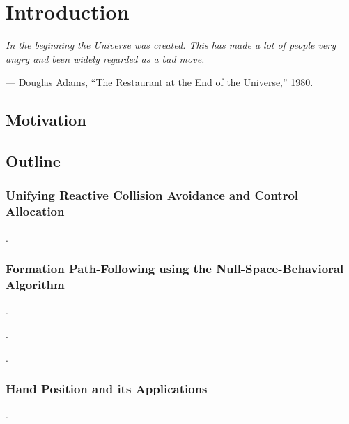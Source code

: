 \chapter{Introduction}
\label{chap:introduction}

\setlength{\epigraphwidth}{0.5\textwidth}
\epigraph{ \it
    In the beginning the Universe was created.
    This has made a lot of people very angry and been widely regarded as a bad move.
}{--- Douglas Adams, ``The Restaurant at the End of the Universe,'' 1980.}

\section{Motivation}



\section{Outline}

\subsection{Unifying Reactive Collision Avoidance and Control Allocation}
.

\subsection{Formation Path-Following using the Null-Space-Behavioral Algorithm}
.

\noindent{}.

\noindent{}.

\subsection{Hand Position and its Applications}
.

\noindent{}

\noindent{}

\noindent{}

\noindent{}
